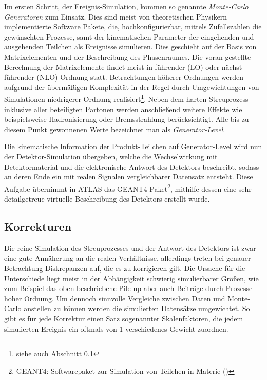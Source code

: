 Im ersten Schritt, der Ereignis-Simulation, kommen so genannte
\textit{Monte-Carlo Generatoren} zum Einsatz. Dies sind meist von theoretischen
Physikern implementierte Software Pakete, die, hochkonfigurierbar, mittels
Zufallszahlen die gewünschten Prozesse, samt der kinematischen Parameter der
eingehenden und ausgehenden Teilchen als Ereignisse simulieren. Dies geschieht
auf der Basis von Matrixelementen und der Beschreibung des Phasenraumes. Die
voran gestellte Berechnung der Matrixelemente findet meist in führender (LO)
oder nächst-führender (NLO) Ordnung statt. Betrachtungen höherer Ordnungen
werden aufgrund der übermäßigen Komplexität in der Regel durch Umgewichtungen
von Simulationen niedrigerer Ordnung realisiert\footnote{siehe auch Abschnitt
\ref{mc_corrections}}. Neben dem harten Streuprozess inklusive aller
beteiligten Partonen werden anschließend weitere Effekte wie beispielsweise
Hadronisierung oder Bremsstrahlung berücksichtigt. Alle bis zu diesem Punkt
gewonnenen Werte bezeichnet man als \textit{Generator-Level}.

Die kinematische Information der Produkt-Teilchen auf Generator-Level wird nun
der Detektor-Simulation übergeben, welche die Wechselwirkung mit
Detektormaterial und die elektronische Antwort des Detektors beschreibt, sodass
an deren Ende ein mit realen Signalen vergleichbarer Datensatz entsteht. Diese
Aufgabe übernimmt in ATLAS das \textsc{GEANT4}-Paket\footnote{\textsc{GEANT4}:
Softwarepaket zur Simulation von Teilchen in Materie
(\cite{Agostinelli:2002hh})}, mithilfe dessen eine sehr detailgetreue virtuelle
Beschreibung des Detektors erstellt wurde.



\subsection{Korrekturen}
\label{mc_corrections}
Die reine Simulation des Streuprozesses und der Antwort des Detektors ist zwar
eine gute Annäherung an die realen Verhältnisse, allerdings treten bei genauer
Betrachtung Diskrepanzen auf, die es zu korrigieren gilt. Die Ursache für die
Unterschiede liegt meist in der Abhängigkeit schwierig simulierbarer Größen,
wie zum Beispiel das oben beschriebene Pile-up aber auch Beiträge durch 
Prozesse hoher Ordnung. Um dennoch sinnvolle Vergleiche zwischen Daten und
Monte-Carlo anstellen zu können werden die simulierten Datensätze umgewichtet.
So gibt es für jede Korrektur einen Satz sogenannter Skalenfaktoren, die jedem
simulierten Ereignis ein oftmals von 1 verschiedenes Gewicht zuordnen.

